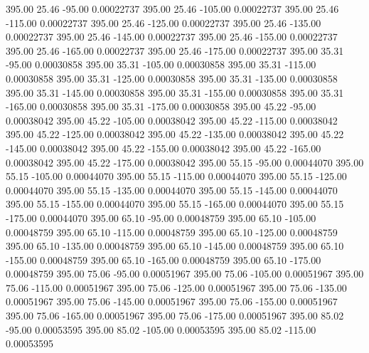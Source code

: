     395.00     25.46    -95.00     0.00022737
    395.00     25.46   -105.00     0.00022737
    395.00     25.46   -115.00     0.00022737
    395.00     25.46   -125.00     0.00022737
    395.00     25.46   -135.00     0.00022737
    395.00     25.46   -145.00     0.00022737
    395.00     25.46   -155.00     0.00022737
    395.00     25.46   -165.00     0.00022737
    395.00     25.46   -175.00     0.00022737
    395.00     35.31    -95.00     0.00030858
    395.00     35.31   -105.00     0.00030858
    395.00     35.31   -115.00     0.00030858
    395.00     35.31   -125.00     0.00030858
    395.00     35.31   -135.00     0.00030858
    395.00     35.31   -145.00     0.00030858
    395.00     35.31   -155.00     0.00030858
    395.00     35.31   -165.00     0.00030858
    395.00     35.31   -175.00     0.00030858
    395.00     45.22    -95.00     0.00038042
    395.00     45.22   -105.00     0.00038042
    395.00     45.22   -115.00     0.00038042
    395.00     45.22   -125.00     0.00038042
    395.00     45.22   -135.00     0.00038042
    395.00     45.22   -145.00     0.00038042
    395.00     45.22   -155.00     0.00038042
    395.00     45.22   -165.00     0.00038042
    395.00     45.22   -175.00     0.00038042
    395.00     55.15    -95.00     0.00044070
    395.00     55.15   -105.00     0.00044070
    395.00     55.15   -115.00     0.00044070
    395.00     55.15   -125.00     0.00044070
    395.00     55.15   -135.00     0.00044070
    395.00     55.15   -145.00     0.00044070
    395.00     55.15   -155.00     0.00044070
    395.00     55.15   -165.00     0.00044070
    395.00     55.15   -175.00     0.00044070
    395.00     65.10    -95.00     0.00048759
    395.00     65.10   -105.00     0.00048759
    395.00     65.10   -115.00     0.00048759
    395.00     65.10   -125.00     0.00048759
    395.00     65.10   -135.00     0.00048759
    395.00     65.10   -145.00     0.00048759
    395.00     65.10   -155.00     0.00048759
    395.00     65.10   -165.00     0.00048759
    395.00     65.10   -175.00     0.00048759
    395.00     75.06    -95.00     0.00051967
    395.00     75.06   -105.00     0.00051967
    395.00     75.06   -115.00     0.00051967
    395.00     75.06   -125.00     0.00051967
    395.00     75.06   -135.00     0.00051967
    395.00     75.06   -145.00     0.00051967
    395.00     75.06   -155.00     0.00051967
    395.00     75.06   -165.00     0.00051967
    395.00     75.06   -175.00     0.00051967
    395.00     85.02    -95.00     0.00053595
    395.00     85.02   -105.00     0.00053595
    395.00     85.02   -115.00     0.00053595
